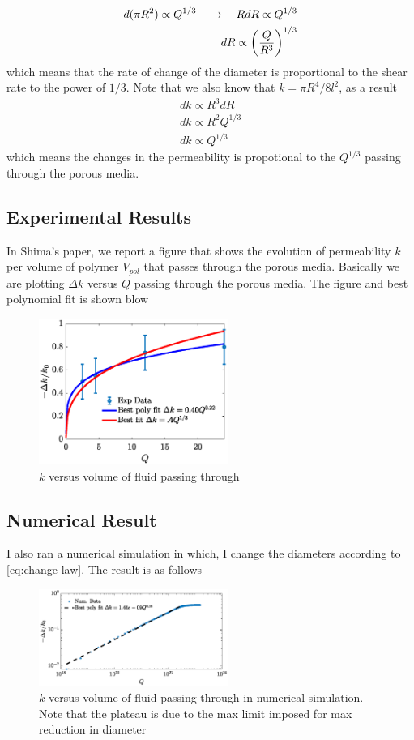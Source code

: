 %
\begin{align}
  d (\pi R^2) \propto Q^{1/3} \quad \to \quad R dR \propto Q^{1/3} \label{eq:change-law} \\
  dR \propto \left( \frac{Q}{R^3}\right)^{1/3}
\end{align}
%
which means that the rate of change of the diameter is proportional to
the shear rate to the power of $1/3$. Note that we also know that
$k = \pi R^4/8l^2$, as a result
%
\begin{align}
  dk \propto R^{3} dR \\
  dk \propto R^2 Q^{1/3} \\
  dk \propto Q^{1/3}
\end{align}
%
which means the changes in the permeability is propotional to the
$Q^{1/3}$ passing through the porous media.

\subsection*{Experimental Results}
%
In Shima's paper, we report a figure that shows the evolution of
permeability $k$ per volume of polymer $V_{pol}$ that passes through
the porous media. Basically we are plotting $\Delta k$ versus $Q$
passing through the porous media. The figure and best polynomial fit
is shown blow
%
%
\begin{figure}[h]
  \centering
  \includegraphics[width=0.55\textwidth]{./Figs/k-evolution.eps}
  \caption{$k$ versus volume of fluid passing through}
\end{figure}



\subsection{Numerical Result}
%
I also ran a numerical simulation in which, I change the diameters
according to \ref{eq:change-law}. The result is as follows
%
\begin{figure}[h]
  \centering
  \includegraphics[width=0.55\textwidth]{./Figs/k-evolution-numerics.eps}
  \caption{$k$ versus volume of fluid passing through in numerical
    simulation. Note that the plateau is due to the max limit imposed
    for max reduction in diameter}
\end{figure}

